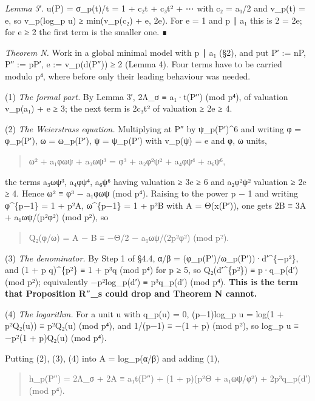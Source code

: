\documentclass[11pt,a4paper]{article}
\theoremstyle{named}
\begin{document}
\textit{Lemma 3′.} u(P) = σ\_p(t)/t = 1 + c₂t + c₃t² + ⋯ with c₂ = a₁/2 and v\_p(t) = e, so v\_p(log\_p u) ≥ min(v\_p(c₂) + e, 2e). For e = 1 and p ∣ a₁ this is 2 = 2e; for e ≥ 2 the first term is the smaller one. ∎

\textit{Theorem N.} Work in a global minimal model with p ∣ a₁ (§2), and put P′ := nP, P″ := pP′, e := v\_p(d(P″)) ≥ 2 (Lemma 4). Four terms have to be carried modulo p⁴, where before only their leading behaviour was needed.

(1) \textit{The formal part.} By Lemma 3′, 2Λ\_σ ≡ a₁·t(P″) (mod p⁴), of valuation v\_p(a₁) + e ≥ 3; the next term is 2c₃t² of valuation ≥ 2e ≥ 4.

(2) \textit{The Weierstrass equation.} Multiplying at P″ by ψ\_p(P′)\textasciicircum{}6 and writing φ = φ\_p(P′), ω = ω\_p(P′), ψ = ψ\_p(P′) with v\_p(ψ) = e and φ, ω units,

\begin{quote}
ω² + a₁φωψ + a₃ωψ³ = φ³ + a₂φ²ψ² + a₄φψ⁴ + a₆ψ⁶,
\end{quote}

the terms a₃ωψ³, a₄φψ⁴, a₆ψ⁶ having valuation ≥ 3e ≥ 6 and a₂φ²ψ² valuation ≥ 2e ≥ 4. Hence ω² ≡ φ³ − a₁φωψ (mod p⁴). Raising to the power p − 1 and writing φ\textasciicircum{}\{p−1\} = 1 + p²A, ω\textasciicircum{}\{p−1\} = 1 + p²B with A = Θ(x(P′)), one gets 2B ≡ 3A + a₁ωψ/(p²φ²) (mod p²), so

\begin{quote}
Q₂(φ/ω) = A − B ≡ −Θ/2 − a₁ωψ/(2p²φ²) (mod p²).
\end{quote}

(3) \textit{The denominator.} By Step 1 of §4.4, α/β = (φ\_p(P′)/ω\_p(P′))·d′\textasciicircum{}\{−p²\}, and (1 + p q)\textasciicircum{}\{p²\} ≡ 1 + p³q (mod p⁴) for p ≥ 5, so Q₂(d′\textasciicircum{}\{p²\}) ≡ p·q\_p(d′) (mod p²); equivalently −p²log\_p(d′) ≡ p³q\_p(d′) (mod p⁴). \textbf{This is the term that Proposition R″\_s could drop and Theorem N cannot.}

(4) \textit{The logarithm.} For a unit u with q\_p(u) = 0, (p−1)log\_p u = log(1 + p²Q₂(u)) ≡ p²Q₂(u) (mod p⁴), and 1/(p−1) ≡ −(1 + p) (mod p²), so log\_p u ≡ −p²(1 + p)Q₂(u) (mod p⁴).

Putting (2), (3), (4) into A = log\_p(α/β) and adding (1),

\begin{quote}
h\_p(P″) = 2Λ\_σ + 2A ≡ a₁t(P″) + (1 + p)(p²Θ + a₁ωψ/φ²) + 2p³q\_p(d′) (mod p⁴).
\end{quote}
\end{document}
